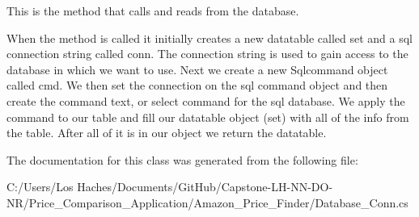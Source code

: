 This is the method that calls and reads from the database. 

When the method is called it initially creates a new datatable called set and a sql connection string called conn. The connection string is used to gain access to the database in which we want to use. Next we create a new Sqlcommand object called cmd. We then set the connection on the sql command object and then create the command text, or select command for the sql database. We apply the command to our table and fill our datatable object (set) with all of the info from the table. After all of it is in our object we return the datatable. 

The documentation for this class was generated from the following file\-:\begin{DoxyCompactItemize}
\item 
C\-:/\-Users/\-Los Haches/\-Documents/\-Git\-Hub/\-Capstone-\/\-L\-H-\/\-N\-N-\/\-D\-O-\/\-N\-R/\-Price\-\_\-\-Comparison\-\_\-\-Application/\-Amazon\-\_\-\-Price\-\_\-\-Finder/Database\-\_\-\-Conn.\-cs\end{DoxyCompactItemize}
